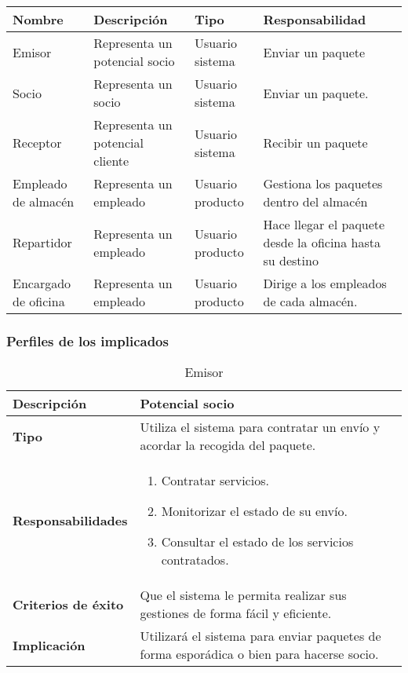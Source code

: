 \documentclass[12pt,spanish]{article}
\begin{document}
\begin{table}[H]
\begin{center}
\begin{tabular}{|p{3cm}|p{4cm}|p{3cm}|p{4cm}|}
\hline
\textbf{Nombre} & \textbf{Descripción} & \textbf{Tipo} & \textbf{Responsabilidad} \\
\hline
Emisor & Representa un potencial socio & Usuario sistema & Enviar un paquete \\
\hline
Socio & Representa un socio & Usuario sistema & Enviar un paquete. \\
\hline
Receptor & Representa un potencial cliente & Usuario sistema & Recibir un paquete \\
\hline
Empleado de almacén & Representa un empleado & Usuario producto & Gestiona los paquetes dentro del almacén \\
\hline
Repartidor & Representa un empleado & Usuario producto & Hace llegar el paquete desde la oficina hasta su destino \\
\hline
Encargado de oficina & Representa un empleado & Usuario producto & Dirige a los empleados de cada almacén.  \\
\hline
\end{tabular}
\end{center}
\end{table}

\subsubsection{Perfiles de los implicados}
\begin{table}[H]
\begin{center}
\begin{tabular}{|l|m{10cm}|}
\hline
\textbf{Descripción} & Potencial socio \\
\hline
\textbf{Tipo} & Utiliza el sistema para contratar un envío y acordar la recogida del paquete. \\
\hline
\textbf{Responsabilidades} & 
\begin{minipage}{5in}
    \vskip 1pt
    \begin{enumerate}
   		\item Contratar servicios.
     	\item Monitorizar el estado de su envío.
  		\item Consultar el estado de los servicios contratados.
   \end{enumerate}
   \vskip 1pt
 \end{minipage}\\ 
\hline
\textbf{Criterios de éxito} & Que el sistema le permita realizar sus gestiones de forma fácil y eficiente.\\
\hline
\textbf{Implicación} & Utilizará el sistema para enviar paquetes de forma esporádica o bien para hacerse socio. \\
\hline
\end{tabular}
\caption{Emisor}
\end{center}
\end{table}
\end{document}
